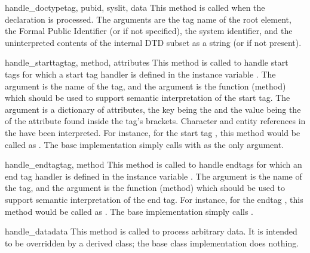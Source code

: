 \begin{methoddesc}{handle_doctype}{tag, pubid, syslit, data}
This method is called when the
 declaration is processed.  The arguments are the
tag name of the root element, the Formal Public Identifier (or  if not specified), the system
identifier, and the uninterpreted contents of the internal DTD subset
as a string (or  if not present).
\end{methoddesc}

\begin{methoddesc}{handle_starttag}{tag, method, attributes}
This method is called to handle start tags for which a start tag
handler is defined in the instance variable .  The
 argument is the name of the tag, and the
 argument is the function (method) which should be used to
support semantic interpretation of the start tag.  The
 argument is a dictionary of attributes, the key being
the  and the value being the  of the attribute
found inside the tag's \code{<>} brackets.  Character and entity
references in the  have been interpreted.  For instance,
for the start tag , this method
would be called as .  The base implementation simply
calls  with  as the only argument.
\end{methoddesc}

\begin{methoddesc}{handle_endtag}{tag, method}
This method is called to handle endtags for which an end tag handler
is defined in the instance variable .  The 
argument is the name of the tag, and the  argument is the
function (method) which should be used to support semantic
interpretation of the end tag.  For instance, for the endtag
, this method would be called as .  The base implementation simply calls
.
\end{methoddesc}

\begin{methoddesc}{handle_data}{data}
This method is called to process arbitrary data.  It is intended to be
overridden by a derived class; the base class implementation does
nothing.
\end{methoddesc}


